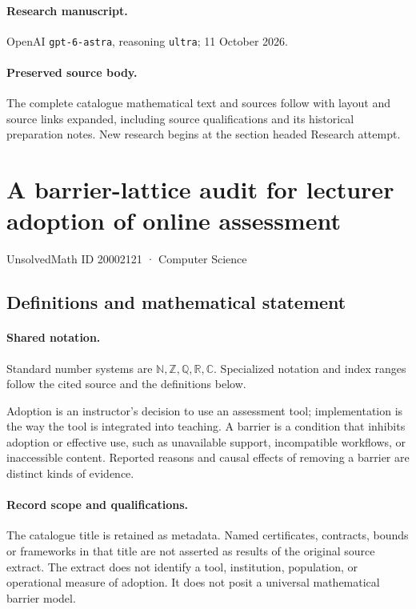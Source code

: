 \documentclass[11pt]{article}
\begin{document}
\paragraph{Research manuscript.} OpenAI \texttt{gpt-6-astra}, reasoning \texttt{ultra}; 11 October 2026.
\paragraph{Preserved source body.} The complete catalogue mathematical text and sources follow with layout and source links expanded, including source qualifications and its historical preparation notes. New research begins at the section headed Research attempt.

\section{A barrier-lattice audit for lecturer adoption of online assessment}\label{20002121}
{\small UnsolvedMath ID 20002121 · Computer Science}
\subsection{Definitions and mathematical statement}

\paragraph{Shared notation.}Standard number systems are $\mathbb N,\mathbb Z,\mathbb Q,\mathbb R,\mathbb C$. Specialized notation and index ranges follow the cited source and the definitions below.


Adoption is an instructor's decision to use an assessment tool; implementation is the way the tool is integrated into teaching. A barrier is a condition that inhibits adoption or effective use, such as unavailable support, incompatible workflows, or inaccessible content. Reported reasons and causal effects of removing a barrier are distinct kinds of evidence.
\paragraph{Record scope and qualifications.}
The catalogue title is retained as metadata. Named certificates, contracts, bounds or frameworks in that title are not asserted as results of the original source extract.
The extract does not identify a tool, institution, population, or operational measure of adoption. It does not posit a universal mathematical barrier model.
\end{document}
